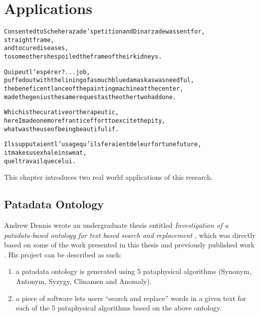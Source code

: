 
\chapter{Applications}
\label{ch:applications}

\startcontents[chapters]

\vfill

\begin{alltt}\sffamily
Consented to Scheherazade's petition and Dinarzade was sent for,
straight frame,
and to cure diseases,
to some others he spoiled the frame of their kidneys.

Qui peut l'espérer ?... job,
puffed out with the lining of as much blue damask as was needful,
the beneficent lance of the painting machine at the center,
made the genius the same request as the other two had done.

Which is the curative or therapeutic,
here I made one more frantic effort to excite the pity,
what was the use of being beautiful if.

Ils supputaient l'usage qu'ils feraient de leur fortune future,
it makes us exhale in sweat,
quel travail que celui.
\end{alltt}

\newpage
\minicontents
\spirals

This chapter introduces two real world applications of this research. 


\section{Patadata Ontology}
\label{s:dennis}

Andrew Dennis wrote an undergraduate thesis entitled \textit{Investigation of a patadata-based ontology for text based search and replacement} \autocite*{Dennis2016}, which was directly based on some of the work presented in this thesis and previously published work \autocite{Raczinski2013,Hugill2013d}. His project can be described as such:

\begin{enumerate}
  \item a patadata ontology is generated using 5 pataphysical algorithms (Synonym, Antonym, Syzygy, Clinamen and Anomaly).
  \item a piece of software lets users ``search and replace'' words in a given text for each of the 5 pataphysical algorithms based on the above ontology.
\end{enumerate}

